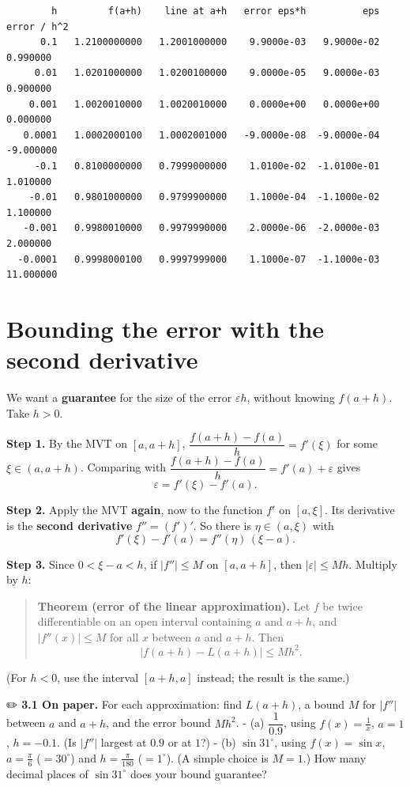 \documentclass[
  letterpaper,
  DIV=11,
  numbers=noendperiod]{scrreprt}
\theoremstyle{plain}
\theoremstyle{plain}
\theoremstyle{definition}
\theoremstyle{definition}
\theoremstyle{definition}
\theoremstyle{plain}
\theoremstyle{plain}
\theoremstyle{remark}
\begin{document}
\begin{verbatim}
        h         f(a+h)    line at a+h   error eps*h          eps  error / h^2
      0.1   1.2100000000   1.2001000000    9.9000e-03   9.9000e-02     0.990000
     0.01   1.0201000000   1.0200100000    9.0000e-05   9.0000e-03     0.900000
    0.001   1.0020010000   1.0020010000    0.0000e+00   0.0000e+00     0.000000
   0.0001   1.0002000100   1.0002001000   -9.0000e-08  -9.0000e-04    -9.000000
     -0.1   0.8100000000   0.7999000000    1.0100e-02  -1.0100e-01     1.010000
    -0.01   0.9801000000   0.9799900000    1.1000e-04  -1.1000e-02     1.100000
   -0.001   0.9980010000   0.9979990000    2.0000e-06  -2.0000e-03     2.000000
  -0.0001   0.9998000100   0.9997999000    1.1000e-07  -1.1000e-03    11.000000
\end{verbatim}

\section{Bounding the error with the second
derivative}\label{bounding-the-error-with-the-second-derivative-1}

We want a \textbf{guarantee} for the size of the error
\(\varepsilon h\), without knowing \(f(a+h)\). Take \(h>0\).

\textbf{Step 1.} By the MVT on \([a, a+h]\),
\(\dfrac{f(a+h)-f(a)}{h} = f'(\xi)\) for some \(\xi\in(a,a+h)\).
Comparing with \(\dfrac{f(a+h)-f(a)}{h} = f'(a) + \varepsilon\) gives
\[\varepsilon = f'(\xi) - f'(a).\]

\textbf{Step 2.} Apply the MVT \textbf{again}, now to the function
\(f'\) on \([a,\xi]\). Its derivative is the \textbf{second derivative}
\(f'' = (f')'\). So there is \(\eta\in(a,\xi)\) with
\[f'(\xi) - f'(a) = f''(\eta)\,(\xi - a).\]

\textbf{Step 3.} Since \(0 < \xi - a < h\), if
\(\lvert f''\rvert \le M\) on \([a,a+h]\), then
\(\lvert\varepsilon\rvert \le M h\). Multiply by \(h\):

\begin{quote}
\textbf{Theorem (error of the linear approximation).} Let \(f\) be twice
differentiable on an open interval containing \(a\) and \(a+h\), and
\(\lvert f''(x)\rvert\le M\) for all \(x\) between \(a\) and \(a+h\).
Then \[\lvert f(a+h) - L(a+h)\rvert \le M h^2 .\]
\end{quote}

(For \(h<0\), use the interval \([a+h,a]\) instead; the result is the
same.)

✏️ \textbf{3.1 On paper.} For each approximation: find \(L(a+h)\), a
bound \(M\) for \(\lvert f''\rvert\) between \(a\) and \(a+h\), and the
error bound \(Mh^2\). - (a) \(\dfrac{1}{0.9}\), using \(f(x)=\frac1x\),
\(a=1\), \(h=-0.1\). (Is \(\lvert f''\rvert\) largest at \(0.9\) or at
\(1\)?) - (b) \(\sin 31^\circ\), using \(f(x)=\sin x\), \(a=\frac\pi6\)
(\(=30^\circ\)) and \(h = \frac{\pi}{180}\) (\(=1^\circ\)). (A simple
choice is \(M=1\).) How many decimal places of \(\sin 31^\circ\) does
your bound guarantee?
\end{document}
